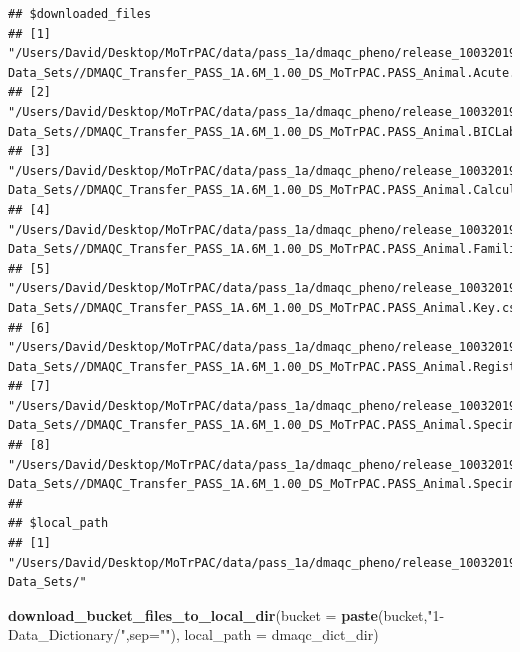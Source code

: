 \documentclass[]{article}
\newenvironment{Shaded}{\begin{snugshade}}{\end{snugshade}}
\newcommand{\KeywordTok}[1]{\textcolor[rgb]{0.13,0.29,0.53}{\textbf{#1}}}
\newcommand{\DataTypeTok}[1]{\textcolor[rgb]{0.13,0.29,0.53}{#1}}
\newcommand{\StringTok}[1]{\textcolor[rgb]{0.31,0.60,0.02}{#1}}
\newcommand{\NormalTok}[1]{#1}
\begin{document}
\begin{verbatim}
## $downloaded_files
## [1] "/Users/David/Desktop/MoTrPAC/data/pass_1a/dmaqc_pheno/release_10032019/3-Data_Sets//DMAQC_Transfer_PASS_1A.6M_1.00_DS_MoTrPAC.PASS_Animal.Acute.Test.csv"          
## [2] "/Users/David/Desktop/MoTrPAC/data/pass_1a/dmaqc_pheno/release_10032019/3-Data_Sets//DMAQC_Transfer_PASS_1A.6M_1.00_DS_MoTrPAC.PASS_Animal.BICLabelData.csv"        
## [3] "/Users/David/Desktop/MoTrPAC/data/pass_1a/dmaqc_pheno/release_10032019/3-Data_Sets//DMAQC_Transfer_PASS_1A.6M_1.00_DS_MoTrPAC.PASS_Animal.Calculated.Variables.csv"
## [4] "/Users/David/Desktop/MoTrPAC/data/pass_1a/dmaqc_pheno/release_10032019/3-Data_Sets//DMAQC_Transfer_PASS_1A.6M_1.00_DS_MoTrPAC.PASS_Animal.Familiarization.csv"     
## [5] "/Users/David/Desktop/MoTrPAC/data/pass_1a/dmaqc_pheno/release_10032019/3-Data_Sets//DMAQC_Transfer_PASS_1A.6M_1.00_DS_MoTrPAC.PASS_Animal.Key.csv"                 
## [6] "/Users/David/Desktop/MoTrPAC/data/pass_1a/dmaqc_pheno/release_10032019/3-Data_Sets//DMAQC_Transfer_PASS_1A.6M_1.00_DS_MoTrPAC.PASS_Animal.Registration.csv"        
## [7] "/Users/David/Desktop/MoTrPAC/data/pass_1a/dmaqc_pheno/release_10032019/3-Data_Sets//DMAQC_Transfer_PASS_1A.6M_1.00_DS_MoTrPAC.PASS_Animal.Specimen.Collection.csv" 
## [8] "/Users/David/Desktop/MoTrPAC/data/pass_1a/dmaqc_pheno/release_10032019/3-Data_Sets//DMAQC_Transfer_PASS_1A.6M_1.00_DS_MoTrPAC.PASS_Animal.Specimen.Processing.csv" 
## 
## $local_path
## [1] "/Users/David/Desktop/MoTrPAC/data/pass_1a/dmaqc_pheno/release_10032019/3-Data_Sets/"
\end{verbatim}

\begin{Shaded}
\begin{Highlighting}[]
\KeywordTok{download_bucket_files_to_local_dir}\NormalTok{(}\DataTypeTok{bucket =} \KeywordTok{paste}\NormalTok{(bucket,}\StringTok{"1-Data_Dictionary/"}\NormalTok{,}\DataTypeTok{sep=}\StringTok{""}\NormalTok{),}
                                   \DataTypeTok{local_path =}\NormalTok{ dmaqc_dict_dir)}
\end{Highlighting}
\end{Shaded}
\end{document}
